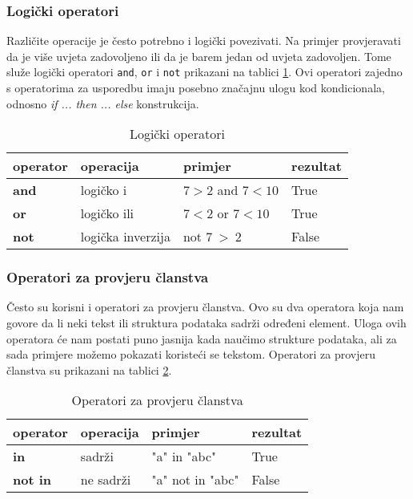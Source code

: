 \subsubsection{Logički operatori}


Različite operacije je često potrebno i logički povezivati. Na primjer provjeravati da je više uvjeta zadovoljeno ili da je barem jedan od uvjeta zadovoljen. Tome služe logički operatori \texttt{and}, \texttt{or} i \texttt{not} prikazani na tablici \ref{tab:operatori-bool}. Ovi operatori zajedno s operatorima za usporedbu imaju posebno značajnu ulogu kod kondicionala, odnosno \textit{if ... then ... else} konstrukcija.

\begin{table}[h!]
    \begin{center}
        \caption{Logički operatori}
        \label{tab:operatori-bool}
        \begin{tabular}{llll}
        	\textbf{operator} & \textbf{operacija} & \textbf{primjer}     & \textbf{rezultat} \\ \hline
        	\textbf{and}      & logičko i          & $7 > 2$ and $7 < 10$ & True              \\
        	\textbf{or}       & logičko ili        & $7 < 2$ or $7 < 10$  & True              \\
        	\textbf{not}      & logička inverzija  & not $7\:>\:2$        & False
        \end{tabular}
    \end{center}
\end{table}

\subsubsection{Operatori za provjeru članstva}

Često su korisni i operatori za provjeru članstva. Ovo su dva operatora koja nam govore da li neki tekst ili struktura podataka sadrži određeni element. Uloga ovih operatora će nam postati puno jasnija kada naučimo strukture podataka, ali za sada primjere možemo pokazati koristeći se tekstom. Operatori za provjeru članstva su prikazani na tablici \ref{tab:operatori-clanstvo}.


\begin{table}[h!]
    \begin{center}
        \caption{Operatori za provjeru članstva}
        \label{tab:operatori-clanstvo}
        \begin{tabular}{llll}
        	\textbf{operator} & \textbf{operacija} & \textbf{primjer} & \textbf{rezultat} \\ \hline
        	\textbf{in}       & sadrži             & "a" in "abc"     & True              \\
        	\textbf{not in}   & ne sadrži          & "a" not in "abc" & False
        \end{tabular}
    \end{center}
\end{table}



